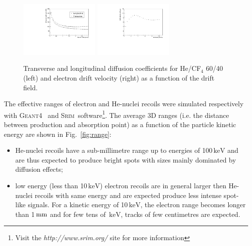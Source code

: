 \documentclass[physics,article,submit,moreauthors,pdftex]{Definitions/mdpi}
\newcommand{\GEANT} {{\textsc{Geant4}}\xspace}
\newcommand{\SRIM} {{\textsc{Srim}}\xspace}
\newcommand{\unit}[1]{\ensuremath{\textrm{\,#1}}\xspace}
\newcommand{\keV}{\ensuremath{\,\textrm{keV}}\xspace}
\begin{document}
\begin{figure}[t!]
\centering
\includegraphics[width=0.35\textwidth]{diff6040_zoom.pdf}
\includegraphics[width=0.35\textwidth]{vdrift6040.pdf}
\caption{Transverse and longitudinal diffusion coefficients for He/CF$_{4}$ 60/40 (left) and electron drift velocity (right) as a function of the drift field.}
\label{fig:diff_vdrift}
\end{figure}


 
The effective ranges of electron and He-nuclei recoils were simulated
respectively with \GEANT~\cite{bib:geant} and
 \SRIM~software\footnote{Visit the {\it http://www.srim.org/} site for more information}. The average 3D ranges (i.e. the distance between production and absorption point) as a function of the particle kinetic energy are shown in Fig.~\ref{fig:range}:
 \begin{itemize}
     \item He-nuclei recoils have a sub-millimetre range up to energies
       of 100\keV and are thus expected to produce bright spots with
       sizes mainly dominated by diffusion effects;
     \item low energy (less than 10\keV) electron recoils are in
       general larger then He-nuclei recoils with same energy and are
       expected produce less intense spot-like signals. For a kinetic
       energy of 10\keV, the electron range becomes longer than
       1\unit{mm} and for few tens of \keV, tracks of few centimetres
       are expected.
 \end{itemize}
\end{document}

